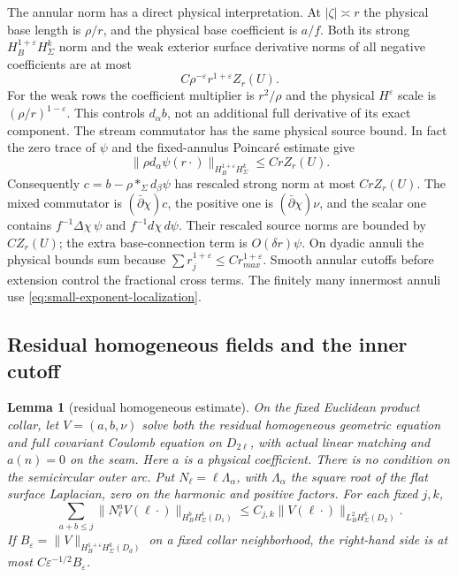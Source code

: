 \documentclass[11pt]{amsart}
\newtheorem{lemma}[theorem]{Lemma}
\theoremstyle{definition}
\theoremstyle{remark}
\theoremstyle{plain}
\begin{document}
The annular norm has a direct physical interpretation. At $|\zeta|\asymp r$
the physical base length is $\rho/r$, and the physical base coefficient
is $a/f$. Both its strong $H^{1+\varepsilon}_BH^k_\Sigma$ norm
and the weak exterior surface derivative norms of all negative
coefficients are at most
\begin{equation}\label{eq:gluing-cap-annular-physical}
                            C\rho^{-\varepsilon}r^{1+\varepsilon}Z_r(U).
\end{equation}
For the weak rows the coefficient multiplier is $r^2/\rho$ and
the physical $H^\varepsilon$ scale is $(\rho/r)^{1-\varepsilon}$.
This controls $d_\alpha b$, not an additional full derivative of
its exact component. The stream commutator has the same physical
source bound. In fact the zero trace of $\psi$ and the fixed-annulus
Poincar\'e estimate give
\[
 \|\rho d_\alpha\psi(r\cdot)\|_{H_B^{1+\varepsilon}H^k_\Sigma}
                         \leq Cr Z_r(U).
\]
Consequently $c=b-\rho *_\Sigma d_\beta\psi$ has rescaled
strong norm at most $CrZ_r(U)$. The mixed commutator is
$(\bar\partial\chi)c$, the positive one is
$(\bar\partial\chi)\nu$, and the scalar one contains
$f^{-1}\Delta\chi\,\psi$ and $f^{-1}d\chi\,d\psi$.
Their rescaled source norms are bounded by $CZ_r(U)$; the extra
base-connection term is $O(\delta r)\psi$. On dyadic annuli the
physical bounds sum because
$\sum r_j^{1+\varepsilon}\leq Cr_{max}^{1+\varepsilon}$.
Smooth annular cutoffs before extension control the fractional
cross terms. The finitely many innermost annuli use
\eqref{eq:small-exponent-localization}.

\subsection{Residual homogeneous fields and the inner cutoff}

\begin{lemma}[residual homogeneous estimate]\label{lem:gluing-residual-homogeneous}
On the fixed Euclidean product collar, let $V=(a,b,\nu)$ solve
both the residual homogeneous geometric equation and full covariant
Coulomb equation on $D_{2\ell}$, with actual linear matching and
$a(n)=0$ on the seam. Here $a$ is a physical coefficient. There
is no condition on the semicircular outer arc. Put
$N_\ell=\ell\Lambda_\alpha$, with $\Lambda_\alpha$ the square
root of the flat surface Laplacian, zero on the harmonic and
positive factors. For each fixed $j,k$,
\begin{equation}\label{eq:gluing-residual-all-mass}
 \sum_{a+b\leq j}\|N_\ell^a V(\ell\cdot)\|_{H_B^bH^k_\Sigma(D_1)}
                \leq C_{j,k}\|V(\ell\cdot)\|_{L_B^2H^k_\Sigma(D_2)}.
\end{equation}
If $B_\varepsilon=\|V\|_{H_B^{1+\varepsilon}H^k_\Sigma(D_d)}$
on a fixed collar neighborhood, the right-hand side is at most
$C\varepsilon^{-1/2}B_\varepsilon$.
\end{lemma}
\end{document}
